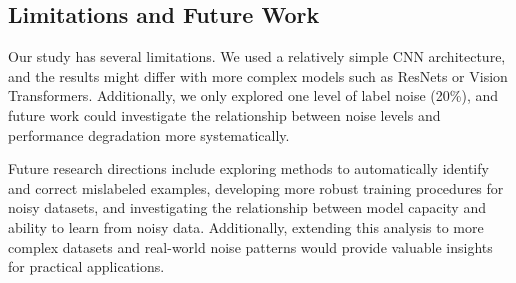 \documentclass[10pt,twocolumn,letterpaper]{article}
\begin{document}
\subsection{Limitations and Future Work}

Our study has several limitations.
We used a relatively simple CNN architecture, and the results might differ with more complex models such as ResNets or Vision Transformers.
Additionally, we only explored one level of label noise (20\%), and future work could investigate the relationship between noise levels and performance degradation more systematically.

Future research directions include exploring methods to automatically identify and correct mislabeled examples, developing more robust training procedures for noisy datasets, and investigating the relationship between model capacity and ability to learn from noisy data.
Additionally, extending this analysis to more complex datasets and real-world noise patterns would provide valuable insights for practical applications.

{\small


}
\end{document}
